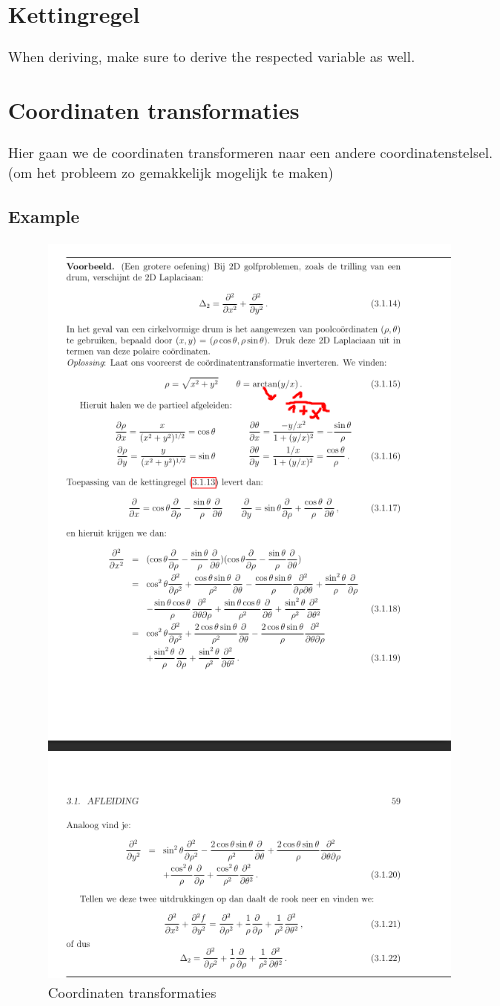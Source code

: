 \documentclass[a4paper]{report}
\begin{document}
\subsection{Kettingregel}

When deriving, make sure to derive the respected variable as well.

\subsection{Coordinaten transformaties}

Hier gaan we de coordinaten transformeren naar een andere coordinatenstelsel. (om het probleem zo gemakkelijk mogelijk te maken)

\subsubsection{Example}

\begin{figure}[H]
	\begin{center}
		\includegraphics[width=0.95\textwidth]{./images/coordinaten.png}
	\end{center}
	\caption{Coordinaten transformaties}
	\label{}
\end{figure}
\end{document}
